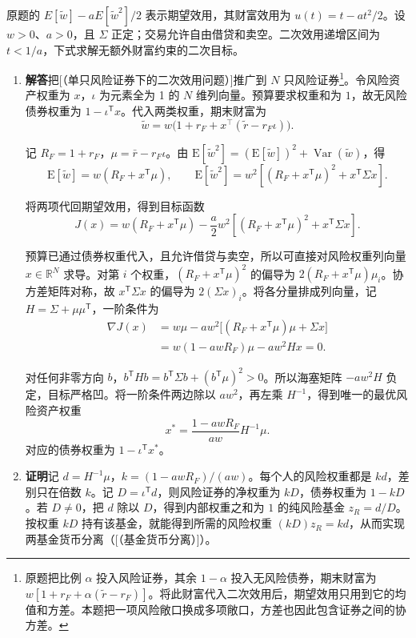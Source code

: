 \begin{solution}[blank-type=manual,blank-vsep=9\baselineskip]
原题的 $E[\tilde w]-aE[\tilde w^2]/2$ 表示期望效用，其财富效用为 $u(t)=t-at^2/2$。设 $w>0$、$a>0$，且 $\Sigma$ 正定；交易允许自由借贷和卖空。二次效用递增区间为 $t<1/a$，下式求解无额外财富约束的二次目标。
\begin{enumerate}[label=(\alph*)]
    \item \textbf{解答}\quad 把[（单只风险证券下的二次效用问题）]推广到 $N$ 只风险证券\footnote{原题把比例 $\alpha$ 投入风险证券，其余 $1-\alpha$ 投入无风险债券，期末财富为 $w[1+r_F+\alpha(\tilde r-r_F)]$。将此财富代入二次效用后，期望效用只用到它的均值和方差。本题把一项风险敞口换成多项敞口，方差也因此包含证券之间的协方差。}。令风险资产权重为 $x$，$\iota$ 为元素全为 1 的 $N$ 维列向量。预算要求权重和为 $1$，故无风险债券权重为 $1-\iota^{\mathsf T}x$。代入两类权重，期末财富为
    \[
        \tilde{w}=w\bigl(1+r_{F}+x^{\top}(\tilde{r}-r_{F}\iota)\bigr).
    \]

    记 $R_F=1+r_F$，$\mu=\bar{r}-r_F\iota$。由 $\mathrm E[\tilde w^2]=(\mathrm E[\tilde w])^2+\operatorname{Var}(\tilde w)$，得
    \[
        \mathrm E[\tilde w]=w(R_F+x^{\mathsf T}\mu),\qquad
        \mathrm E[\tilde w^2]=w^2[(R_F+x^{\mathsf T}\mu)^2+x^{\mathsf T}\Sigma x].
    \]

    将两项代回期望效用，得到目标函数
    \[
        J(x)=w(R_F+x^{\mathsf T}\mu)
        -\frac a2 w^2[(R_F+x^{\mathsf T}\mu)^2+x^{\mathsf T}\Sigma x].
    \]

    预算已通过债券权重代入，且允许借贷与卖空，所以可直接对风险权重列向量 $x\in\mathbb R^N$ 求导。对第 $i$ 个权重，$(R_F+x^{\mathsf T}\mu)^2$ 的偏导为 $2(R_F+x^{\mathsf T}\mu)\mu_i$。协方差矩阵对称，故 $x^{\mathsf T}\Sigma x$ 的偏导为 $2(\Sigma x)_i$。将各分量排成列向量，记 $H=\Sigma+\mu\mu^{\mathsf T}$，一阶条件为
    \[
    \begin{aligned}
        \nabla J(x)&=w\mu-aw^2\bigl[(R_F+x^{\mathsf T}\mu)\mu+\Sigma x\bigr]\\
        &=w(1-awR_F)\mu-aw^2Hx=0.
    \end{aligned}
    \]

    对任何非零方向 $b$，$b^{\mathsf T}Hb=b^{\mathsf T}\Sigma b+(b^{\mathsf T}\mu)^2>0$。所以海塞矩阵 $-aw^2H$ 负定，目标严格凹。将一阶条件两边除以 $aw^2$，再左乘 $H^{-1}$，得到唯一的最优风险资产权重
    \[
        x^*=\frac{1-awR_F}{aw}H^{-1}\mu.
    \]
    对应的债券权重为 $1-\iota^{\mathsf T}x^*$。

    \item \textbf{证明}\quad 记 $d=H^{-1}\mu$，$k=(1-awR_F)/(aw)$。每个人的风险权重都是 $kd$，差别只在倍数 $k$。记 $D=\iota^{\mathsf T}d$，则风险证券的净权重为 $kD$，债券权重为 $1-kD$。若 $D\ne0$，把 $d$ 除以 $D$，得到内部权重之和为 $1$ 的纯风险基金 $z_R=d/D$。按权重 $kD$ 持有该基金，就能得到所需的风险权重 $(kD)z_R=kd$，从而实现两基金货币分离\ifdefined\WJHandoutKnowledge（[（基金货币分离）]）\fi。


\end{enumerate}
\end{solution}
